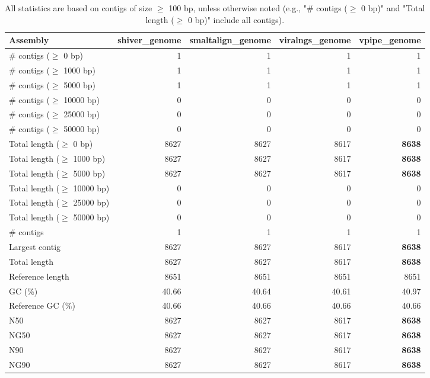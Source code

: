 \documentclass[12pt,a4paper]{article}
\begin{document}
\begin{table}[ht]
\begin{center}
\caption{All statistics are based on contigs of size $\geq$ 100 bp, unless otherwise noted (e.g., "\# contigs ($\geq$ 0 bp)" and "Total length ($\geq$ 0 bp)" include all contigs).}
\begin{tabular}{|l*{4}{|r}|}
\hline
Assembly & shiver\_genome & smaltalign\_genome & viralngs\_genome & vpipe\_genome \\ \hline
\# contigs ($\geq$ 0 bp) & 1 & 1 & 1 & 1 \\ \hline
\# contigs ($\geq$ 1000 bp) & 1 & 1 & 1 & 1 \\ \hline
\# contigs ($\geq$ 5000 bp) & 1 & 1 & 1 & 1 \\ \hline
\# contigs ($\geq$ 10000 bp) & 0 & 0 & 0 & 0 \\ \hline
\# contigs ($\geq$ 25000 bp) & 0 & 0 & 0 & 0 \\ \hline
\# contigs ($\geq$ 50000 bp) & 0 & 0 & 0 & 0 \\ \hline
Total length ($\geq$ 0 bp) & 8627 & 8627 & 8617 & {\bf 8638} \\ \hline
Total length ($\geq$ 1000 bp) & 8627 & 8627 & 8617 & {\bf 8638} \\ \hline
Total length ($\geq$ 5000 bp) & 8627 & 8627 & 8617 & {\bf 8638} \\ \hline
Total length ($\geq$ 10000 bp) & 0 & 0 & 0 & 0 \\ \hline
Total length ($\geq$ 25000 bp) & 0 & 0 & 0 & 0 \\ \hline
Total length ($\geq$ 50000 bp) & 0 & 0 & 0 & 0 \\ \hline
\# contigs & 1 & 1 & 1 & 1 \\ \hline
Largest contig & 8627 & 8627 & 8617 & {\bf 8638} \\ \hline
Total length & 8627 & 8627 & 8617 & {\bf 8638} \\ \hline
Reference length & 8651 & 8651 & 8651 & 8651 \\ \hline
GC (\%) & 40.66 & 40.64 & 40.61 & 40.97 \\ \hline
Reference GC (\%) & 40.66 & 40.66 & 40.66 & 40.66 \\ \hline
N50 & 8627 & 8627 & 8617 & {\bf 8638} \\ \hline
NG50 & 8627 & 8627 & 8617 & {\bf 8638} \\ \hline
N90 & 8627 & 8627 & 8617 & {\bf 8638} \\ \hline
NG90 & 8627 & 8627 & 8617 & {\bf 8638} \\ \hline

\end{tabular}
\end{center}
\end{table}
\end{document}
